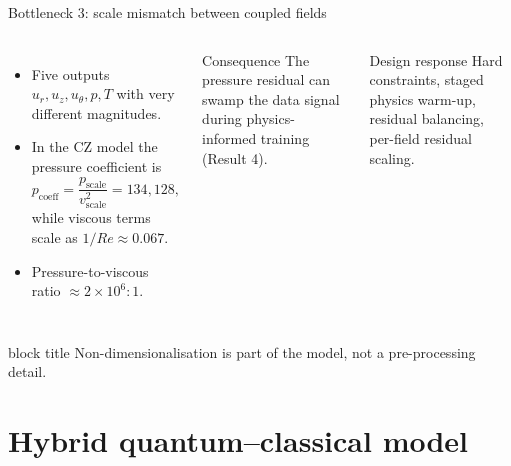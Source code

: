 \documentclass[aspectratio=169,10pt]{beamer}
\newcommand{\takeaway}[1]{%
  \vfill
  \begin{beamercolorbox}[rounded=true,shadow=false,wd=\linewidth,sep=4pt]{block title}
  \small\centering #1
  \end{beamercolorbox}}
\begin{document}
\begin{frame}{Bottleneck 3: scale mismatch between coupled fields}
\begin{columns}[T,onlytextwidth]
\begin{itemize}
  \item Five outputs $u_r, u_z, u_\theta, p, T$ with very different magnitudes.
  \item In the CZ model the pressure coefficient is
  \[p_{\mathrm{coeff}} = \frac{p_{\mathrm{scale}}}{v_{\mathrm{scale}}^2} = 134{,}128,\]
  while viscous terms scale as $1/Re \approx 0.067$.
  \item Pressure-to-viscous ratio $\approx 2\times10^{6}:1$.
\end{itemize}
\begin{alertblock}{Consequence}
The pressure residual can swamp the data signal during physics-informed training (Result 4).
\end{alertblock}
\vspace{0.2cm}
\begin{block}{Design response}
Hard constraints, staged physics warm-up, residual balancing, per-field residual scaling.
\end{block}
\end{columns}
\takeaway{Non-dimensionalisation is part of the model, not a pre-processing detail.}
\end{frame}

\section{Hybrid quantum--classical model}
\end{document}
